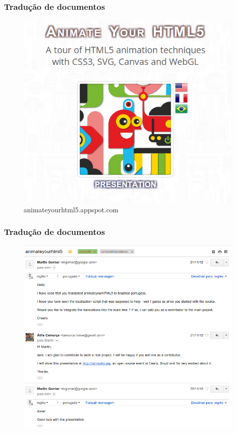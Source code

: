 \begin{frame}\frametitle{Tradução de documentos}

\begin{figure}
   \includegraphics[scale=0.35]{img/animateyourhtml5.png}
   \caption{animateyourhtml5.appspot.com}
\end{figure}

\end{frame}

\begin{frame}\frametitle{Tradução de documentos}

\begin{figure}
   \includegraphics[scale=0.35]{img/martin-gorner.png}
\end{figure}

\end{frame}

